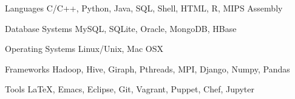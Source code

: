 

\begin{cvskills}

  \cvskill
    {Languages} %
    {C/C++, Python, Java, SQL, Shell, HTML, R, MIPS Assembly} %

  \cvskill
    {Database Systems} %
    {MySQL, SQLite, Oracle, MongoDB, HBase} %

  \cvskill
    {Operating Systems} %
    {Linux/Unix, Mac OSX}

  \cvskill
    {Frameworks} %
    {Hadoop, Hive, Giraph, Pthreads, MPI, Django, Numpy, Pandas}

  \cvskill
    {Tools} %
    {LaTeX, Emacs, Eclipse, Git, Vagrant, Puppet, Chef, Jupyter} %

\end{cvskills}
